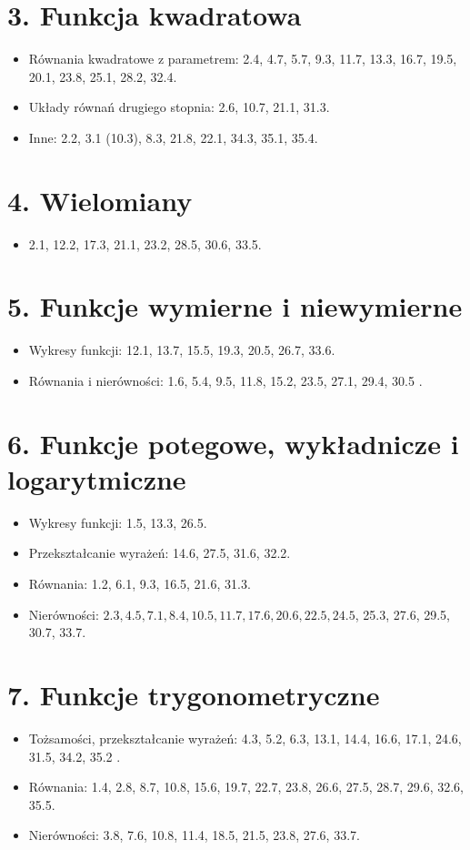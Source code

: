 \documentclass[10pt]{article}
\begin{document}
\section*{3. Funkcja kwadratowa}
\begin{itemize}
  \item Równania kwadratowe z parametrem: 2.4, 4.7, 5.7, 9.3, 11.7, 13.3, 16.7, 19.5, 20.1, 23.8, 25.1, 28.2, 32.4.
  \item Układy równań drugiego stopnia: 2.6, 10.7, 21.1, 31.3.
  \item Inne: 2.2, 3.1 (10.3), 8.3, 21.8, 22.1, 34.3, 35.1, 35.4.
\end{itemize}

\section*{4. Wielomiany}
\begin{itemize}
  \item 2.1, 12.2, 17.3, 21.1, 23.2, 28.5, 30.6, 33.5.
\end{itemize}

\section*{5. Funkcje wymierne i niewymierne}
\begin{itemize}
  \item Wykresy funkcji: 12.1, 13.7, 15.5, 19.3, 20.5, 26.7, 33.6.
  \item Równania i nierówności: 1.6, 5.4, 9.5, 11.8, 15.2, 23.5, 27.1, 29.4, 30.5 .
\end{itemize}

\section*{6. Funkcje potegowe, wykładnicze i logarytmiczne}
\begin{itemize}
  \item Wykresy funkcji: 1.5, 13.3, 26.5.
  \item Przekształcanie wyrażeń: 14.6, 27.5, 31.6, 32.2.
  \item Równania: 1.2, 6.1, 9.3, 16.5, 21.6, 31.3.
  \item Nierówności: $2.3,4.5,7.1,8.4,10.5,11.7,17.6,20.6,22.5,24.5$, 25.3, 27.6, 29.5, 30.7, 33.7.
\end{itemize}

\section*{7. Funkcje trygonometryczne}
\begin{itemize}
  \item Tożsamości, przekształcanie wyrażeń: 4.3, 5.2, 6.3, 13.1, 14.4, 16.6, 17.1, 24.6, 31.5, 34.2, 35.2 .
  \item Równania: 1.4, 2.8, 8.7, 10.8, 15.6, 19.7, 22.7, 23.8, 26.6, 27.5, 28.7, 29.6, 32.6, 35.5.
  \item Nierówności: 3.8, 7.6, 10.8, 11.4, 18.5, 21.5, 23.8, 27.6, 33.7.
\end{itemize}
\end{document}
